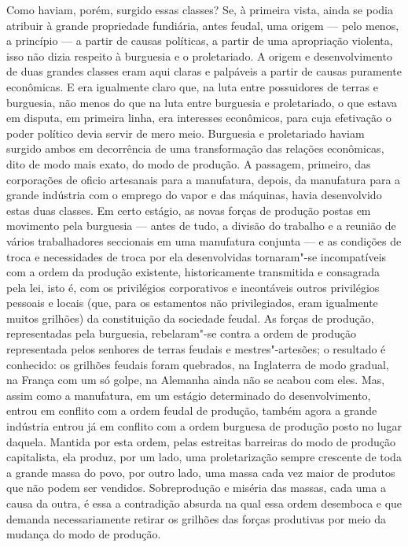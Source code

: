 Como haviam, porém, surgido essas classes? Se, à primeira vista, ainda
se podia atribuir à grande propriedade fundiária, antes feudal, uma
origem --- pelo menos, a princípio --- a partir de causas políticas, a
partir de uma apropriação violenta, isso não dizia respeito à burguesia
e o proletariado. A origem e desenvolvimento de duas grandes classes
eram aqui claras e palpáveis a partir de causas puramente econômicas. E
era igualmente claro que, na luta entre possuidores de terras e
burguesia, não menos do que na luta entre burguesia e proletariado, o
que estava em disputa, em primeira linha, era interesses econômicos,
para cuja efetivação o poder político devia servir de mero meio.
Burguesia e proletariado haviam surgido ambos em decorrência de uma
transformação das relações econômicas, dito de modo mais exato, do modo
de produção. A passagem, primeiro, das corporações de oficio artesanais
para a manufatura, depois, da manufatura para a grande indústria com o
emprego do vapor e das máquinas, havia desenvolvido estas duas classes.
Em certo estágio, as novas forças de produção postas em movimento pela
burguesia --- antes de tudo, a divisão do trabalho e a reunião de vários
trabalhadores seccionais em uma manufatura conjunta --- e as condições de
troca e necessidades de troca por ela desenvolvidas tornaram"-se
incompatíveis com a ordem da produção existente, historicamente
transmitida e consagrada pela lei, isto é, com os privilégios
corporativos e incontáveis outros privilégios pessoais e locais (que,
para os estamentos não privilegiados, eram igualmente muitos grilhões)
da constituição da sociedade feudal. As forças de produção,
representadas pela burguesia, rebelaram"-se contra a ordem de produção
representada pelos senhores de terras feudais e mestres"-artesões; o
resultado é conhecido: os grilhões feudais foram quebrados, na
Inglaterra de modo gradual, na França com um só golpe, na Alemanha ainda
não se acabou com eles. Mas, assim como a manufatura, em um estágio
determinado do desenvolvimento, entrou em conflito com a ordem feudal de
produção, também agora a grande indústria entrou já em conflito com a
ordem burguesa de produção posto no lugar daquela. Mantida por esta
ordem, pelas estreitas barreiras do modo de produção capitalista, ela
produz, por um lado, uma proletarização sempre crescente de toda a
grande massa do povo, por outro lado, uma massa cada vez maior de
produtos que não podem ser vendidos. Sobreprodução e miséria das massas,
cada uma a causa da outra, é essa a contradição absurda na qual essa
ordem desemboca e que demanda necessariamente retirar os grilhões das
forças produtivas por meio da mudança do modo de produção.

